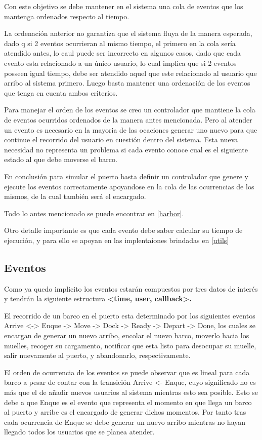 		Con este objetivo se debe mantener en el sistema una cola de eventos que los mantenga ordenados
		respecto al tiempo.

		La ordenaci\'on anterior no garantiza que el sistema fluya de la manera esperada, dado q si 2 
		eventos ocurrieran al mismo tiempo, el primero en la cola ser\'ia atendido antes, lo caul puede 
		ser incorrecto en algunos casos, dado que cada evento esta relacionado a un \'unico usuario, lo 
		cual implica que si 2 eventos posseen igual tiempo, debe ser atendido aquel que este relacionado 
		al usuario que arribo al sistema primero. Luego basta mantener una ordenaci\'on de los
		eventos que tenga en cuenta ambos criterios.

		Para manejar el orden de los eventos se creo un controlador que mantiene la cola de eventos 
		ocurridos ordenados de la manera antes mencionada. Pero al atender un evento es necesario 
		en la mayoria de las ocaciones generar uno nuevo para que continue el recorrido del usuario
		en cuesti\'on dentro del sistema. Esta nueva necesidad no representa un problema si cada
		evento conoce cual es el siguiente estado al que debe moverse el barco.

		En conclusi\'on para simular el puerto basta definir un controlador que genere y 
		ejecute los eventos correctamente apoyandose en la cola de las ocurrencias de los mismos, 
		de la cual tambi\'en ser\'a el encargado. 

		Todo lo antes mencionado se puede encontrar en \ref{harbor}.

		Otro detalle importante es que cada evento debe saber calcular su tiempo de
		ejecuci\'on, y para ello se apoyan en las implentaiones brindadas en \ref{utils}

	\subsection{Eventos}
		Como ya quedo implicito los eventos estar\'an compuestos por tres datos de 
		inter\'es y tendr\'an la siguiente estructura \bf{<time, user, callback>}.

		El recorrido de un barco en el puerto esta determinado por los siguientes eventos
		Arrive <-> Enque -> Move -> Dock -> Ready -> Depart -> Done, los cuales se
		encargan de generar un nuevo arribo, encolar el nuevo barco, moverlo hacia los
		muelles, recoger su cargamento, notificar que esta listo para desocupar su muelle,
		salir nuevamente al puerto, y abandonarlo, respectivamente.

		El orden de ocurrencia de los eventos se puede observar que es lineal para cada 
		barco a pesar de contar con la transici\'on Arrive <- Enque, cuyo significado no es
		m\'as que el de a\~nadir nuevos usuarios al sistema mientras esto sea posible. Esto
		se debe a que Enque es el evento que representa el momento en que llega un barco al
		puerto y arribe es el encargado de generar dichos momentos. Por tanto tras cada
		ocurrencia de Enque se debe generar un nuevo arribo mientras no hayan llegado
		todos los usuarios que se planea atender.

